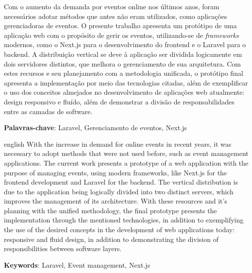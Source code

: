 \documentclass[
	12pt,			%
	openany,		%
	oneside,		%
	a4paper,		%
	english,		%
	brazil			%
	]{abntex2}
\begin{document}
\setlength{\absparsep}{18pt} %

\begin{resumo}
Com o aumento da demanda por eventos online nos últimos anos, foram necessários adotar métodos que antes não eram utilizados, como aplicações gerenciadoras de eventos. O presente trabalho apresenta um protótipo de uma aplicação web com o propósito de gerir os eventos, utilizando-se de \textit{frameworks} modernos, como o Next.js para o desenvolvimento do frontend e o Laravel para o backend. A distribuição vertical se deve à aplicação ser dividida logicamente em dois servidores distintos, que melhora o gerenciamento de sua arquitetura. Com estes recursos e seu planejamento com a metodologia unificada, o protótipo final apresenta a implementação por meio das tecnologias citadas, além de exemplificar o uso dos conceitos almejados no desenvolvimento de aplicações web atualmente: design responsivo e fluído, além de demonstrar a divisão de responsabilidades entre as camadas de software.

\textbf{Palavras-chave}: Laravel, Gerenciamento de eventos, Next.js
\end{resumo}

\begin{resumo}[Abstract]
\begin{otherlanguage*}{english}
With the increase in demand for online events in recent years, it was necessary to adopt methods that were not used before, such as event management applications. The current work presents a prototype of a web application with the purpose of managing events, using modern frameworks, like Next.js for the frontend development and Laravel for the backend. The vertical distribution is due to the application being logically divided into two distinct servers, which improves the management of its architecture. With these resources and it's planning with the unified methodology, the final prototype presents the implementation through the mentioned technologies, in addition to exemplifying the use of the desired concepts in the development of web applications today: responsive and fluid design, in addition to demonstrating the division of responsibilities between software layers.

\textbf{Keywords}: Laravel, Event management, Next.js
\end{otherlanguage*}
\end{resumo}
 
\end{document}
